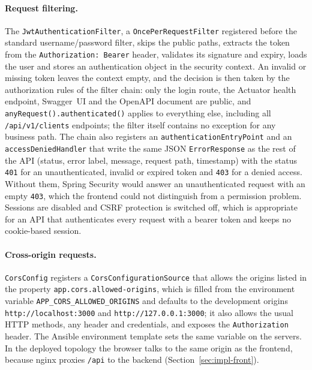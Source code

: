 \paragraph{Request filtering.} The \texttt{JwtAuthenticationFilter}, a \texttt{OncePerRequestFilter} registered before the standard username/password filter, skips the public paths, extracts the token from the \texttt{Authorization: Bearer} header, validates its signature and expiry, loads the user and stores an authentication object in the security context. An invalid or missing token leaves the context empty, and the decision is then taken by the authorization rules of the filter chain: only the login route, the Actuator health endpoint, Swagger~UI and the OpenAPI document are public, and \texttt{anyRequest().authenticated()} applies to everything else, including all \texttt{/api/v1/clients} endpoints; the filter itself contains no exception for any business path. The chain also registers an \texttt{authenticationEntryPoint} and an \texttt{accessDeniedHandler} that write the same JSON \texttt{ErrorResponse} as the rest of the API (status, error label, message, request path, timestamp) with the status \texttt{401} for an unauthenticated, invalid or expired token and \texttt{403} for a denied access. Without them, Spring Security would answer an unauthenticated request with an empty \texttt{403}, which the frontend could not distinguish from a permission problem. Sessions are disabled and CSRF protection is switched off, which is appropriate for an API that authenticates every request with a bearer token and keeps no cookie-based session.



\paragraph{Cross-origin requests.} \texttt{CorsConfig} registers a \texttt{CorsConfigurationSource} that allows the origins listed in the property \texttt{app.cors.allowed-origins}, which is filled from the environment variable \texttt{APP\_CORS\_ALLOWED\_ORIGINS} and defaults to the development origins \texttt{http://localhost:3000} and \texttt{http://127.0.0.1:3000}; it also allows the usual HTTP methods, any header and credentials, and exposes the \texttt{Authorization} header. The Ansible environment template sets the same variable on the servers. In the deployed topology the browser talks to the same origin as the frontend, because nginx proxies \texttt{/api} to the backend (Section~\ref{sec:impl-front}).

